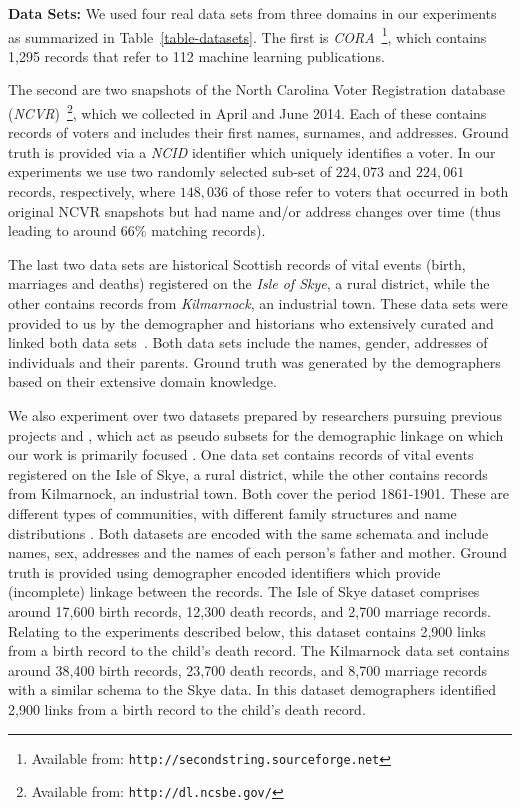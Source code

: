 \documentclass{llncs}
\begin{document}
\smallskip
\textbf{Data Sets:}
%
We used four real data sets from three domains in our experiments as
summarized in Table~\ref{table-datasets}. The first is
\emph{CORA}~\footnote{Available from:
\texttt{http://secondstring.sourceforge.net}}, which contains 1,295
records that refer to 112 machine learning publications.

The second are two snapshots of the North Carolina Voter Registration
database (\emph{NCVR})~\footnote{Available from: \texttt{http://dl.ncsbe.gov/}}, which we collected in April and June
2014. Each of these contains records of voters and includes their
first names, surnames, and addresses. Ground truth is provided via a
\emph{NCID} identifier which uniquely identifies a voter. In our
experiments we use two randomly selected sub-set of $224,073$ and
$224,061$ records, respectively, where $148,036$ of those refer to
voters that occurred in both original NCVR snapshots but had name
and/or address changes over time (thus leading to around $66\%$
matching records).

The last two data sets are historical Scottish records of vital
events (birth, marriages and deaths) registered on the
\emph{Isle of Skye}, a rural district, while the other contains
records from \emph{Kilmarnock}, an industrial town. These data sets
were provided to us by the demographer and historians who extensively
curated and linked both data sets~\cite{reid2002,reid2006}. Both data
sets include the  names, gender, addresses of individuals and their
parents. Ground truth was generated by the demographers based on their
extensive domain knowledge.


\iffalse
We also experiment over two datasets prepared by researchers pursuing previous projects \cite{reid2002} and \cite{reid2006}, which act as pseudo subsets for the demographic linkage on which our work is primarily focused . One data set contains records of vital events registered on the Isle of Skye, a rural district, while the other contains records from Kilmarnock, an industrial town. Both cover the period 1861-1901. These are different types of communities, with different family structures and name distributions \cite{reid2002}. Both datasets are encoded with the same schemata and include names, sex, addresses and the names of each person's father and mother. Ground truth is provided using demographer encoded identifiers which provide (incomplete) linkage between the records.  The Isle of Skye dataset comprises around 17,600 birth records, 12,300 death records, and 2,700 marriage records. Relating to the experiments described below, this dataset contains 2,900 links from a birth record to the child's death record. The Kilmarnock data set contains around 38,400 birth records, 23,700 death records, and 8,700 marriage records with a similar schema to the Skye data. In this dataset demographers identified  2,900 links from a birth record to the child's death record.
\end{document}
